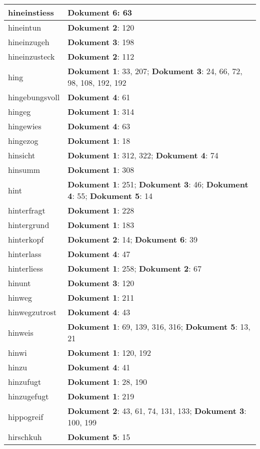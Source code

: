 \documentclass[a5paper]{article}
\begin{document}
\begin{longtable}[l]{|l|p{3in}|}
\hline
hineinstiess & \textbf{Dokument 6}: 63 \\
\hline
hineintun & \textbf{Dokument 2}: 120 \\
\hline
hineinzugeh & \textbf{Dokument 3}: 198 \\
\hline
hineinzusteck & \textbf{Dokument 2}: 112 \\
\hline
hing & \textbf{Dokument 1}: 33, 207; \textbf{Dokument 3}: 24, 66, 72, 98, 108, 192, 192 \\
\hline
hingebungsvoll & \textbf{Dokument 4}: 61 \\
\hline
hingeg & \textbf{Dokument 1}: 314 \\
\hline
hingewies & \textbf{Dokument 4}: 63 \\
\hline
hingezog & \textbf{Dokument 1}: 18 \\
\hline
hinsicht & \textbf{Dokument 1}: 312, 322; \textbf{Dokument 4}: 74 \\
\hline
hinsumm & \textbf{Dokument 1}: 308 \\
\hline
hint & \textbf{Dokument 1}: 251; \textbf{Dokument 3}: 46; \textbf{Dokument 4}: 55; \textbf{Dokument 5}: 14 \\
\hline
hinterfragt & \textbf{Dokument 1}: 228 \\
\hline
hintergrund & \textbf{Dokument 1}: 183 \\
\hline
hinterkopf & \textbf{Dokument 2}: 14; \textbf{Dokument 6}: 39 \\
\hline
hinterlass & \textbf{Dokument 4}: 47 \\
\hline
hinterliess & \textbf{Dokument 1}: 258; \textbf{Dokument 2}: 67 \\
\hline
hinunt & \textbf{Dokument 3}: 120 \\
\hline
hinweg & \textbf{Dokument 1}: 211 \\
\hline
hinwegzutrost & \textbf{Dokument 4}: 43 \\
\hline
hinweis & \textbf{Dokument 1}: 69, 139, 316, 316; \textbf{Dokument 5}: 13, 21 \\
\hline
hinwi & \textbf{Dokument 1}: 120, 192 \\
\hline
hinzu & \textbf{Dokument 4}: 41 \\
\hline
hinzufugt & \textbf{Dokument 1}: 28, 190 \\
\hline
hinzugefugt & \textbf{Dokument 1}: 219 \\
\hline
hippogreif & \textbf{Dokument 2}: 43, 61, 74, 131, 133; \textbf{Dokument 3}: 100, 199 \\
\hline
hirschkuh & \textbf{Dokument 5}: 15 \\

\end{longtable}
\end{document}
